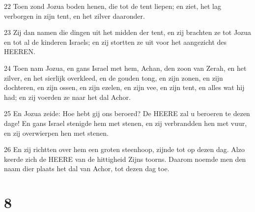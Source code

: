 \par 22 Toen zond Jozua boden henen, die tot de tent liepen; en ziet, het lag verborgen in zijn tent, en het zilver daaronder.
\par 23 Zij dan namen die dingen uit het midden der tent, en zij brachten ze tot Jozua en tot al de kinderen Israels; en zij stortten ze uit voor het aangezicht des HEEREN.
\par 24 Toen nam Jozua, en gans Israel met hem, Achan, den zoon van Zerah, en het zilver, en het sierlijk overkleed, en de gouden tong, en zijn zonen, en zijn dochteren, en zijn ossen, en zijn ezelen, en zijn vee, en zijn tent, en alles wat hij had; en zij voerden ze naar het dal Achor.
\par 25 En Jozua zeide: Hoe hebt gij ons beroerd? De HEERE zal u beroeren te dezen dage! En gans Israel stenigde hem met stenen, en zij verbrandden hen met vuur, en zij overwierpen hen met stenen.
\par 26 En zij richtten over hem een groten steenhoop, zijnde tot op dezen dag. Alzo keerde zich de HEERE van de hittigheid Zijns toorns. Daarom noemde men den naam dier plaats het dal van Achor, tot dezen dag toe.

\chapter{8}

